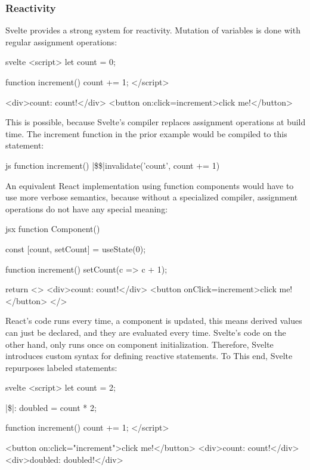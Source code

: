 \subsubsection{Reactivity}

Svelte provides a strong system for reactivity. Mutation of variables is done with regular assignment operations:

\begin{myminted}{svelte}{}
<script>
    let count = 0;

    function increment() {
        count += 1;
    }
</script>

<div>count: {count}!</div>
<button on:click={increment}>click me!</button>
\end{myminted}

This is possible, because Svelte's compiler replaces assignment operations at build time. The increment function in the prior example would be compiled to this statement:

\begin{myminted}[escapeinside=||]{js}{}
function increment() {
    |\$\$|invalidate('count', count += 1)
}
\end{myminted}

An equivalent React implementation using function components would have to use more verbose semantics, because without a specialized compiler, assignment operations do not have any special meaning:

\begin{myminted}{jsx}{}
function Component() {
    const [count, setCount] = useState(0);

    function increment() {
        setCount(c => c + 1);
    }

    return <>
        <div>count: {count}!</div>
        <button onClick={increment}>click me!</button>
    </>
}
\end{myminted}

React's code runs every time, a component is updated, this means derived values can just be declared, and they are evaluated every time. Svelte's code on the other hand, only runs once on component initialization. Therefore, Svelte introduces custom syntax for defining reactive statements. To This end, Svelte repurposes labeled statements:


\begin{myminted}[highlightlines={4},escapeinside=||]{svelte}{}
<script>
    let count = 2;

    |\$|: doubled = count * 2;

    function increment() {
        count += 1;
    }
</script>

<button on:click="{increment}">click me!</button>
<div>count: {count}!</div>
<div>doubled: {doubled}!</div>
\end{myminted}

